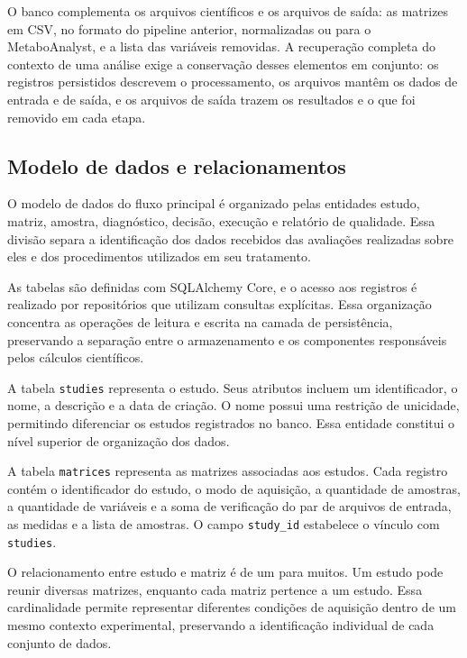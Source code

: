 O banco complementa os arquivos científicos e os arquivos de saída: as matrizes em CSV, no formato do pipeline anterior, normalizadas ou para o MetaboAnalyst, e a lista das variáveis removidas. A recuperação completa do contexto de uma análise exige a conservação desses elementos em conjunto: os registros persistidos descrevem o processamento, os arquivos mantêm os dados de entrada e de saída, e os arquivos de saída trazem os resultados e o que foi removido em cada etapa.

\subsection{Modelo de dados e relacionamentos}
\label{subsec:modelo-dados-relacionamentos}

O modelo de dados do fluxo principal é organizado pelas entidades estudo, matriz, amostra, diagnóstico, decisão, execução e relatório de qualidade. Essa divisão separa a identificação dos dados recebidos das avaliações realizadas sobre eles e dos procedimentos utilizados em seu tratamento.

As tabelas são definidas com SQLAlchemy Core, e o acesso aos registros é realizado por repositórios que utilizam consultas explícitas. Essa organização concentra as operações de leitura e escrita na camada de persistência, preservando a separação entre o armazenamento e os componentes responsáveis pelos cálculos científicos.

A tabela \texttt{studies} representa o estudo. Seus atributos incluem um identificador, o nome, a descrição e a data de criação. O nome possui uma restrição de unicidade, permitindo diferenciar os estudos registrados no banco. Essa entidade constitui o nível superior de organização dos dados.

A tabela \texttt{matrices} representa as matrizes associadas aos estudos. Cada registro contém o identificador do estudo, o modo de aquisição, a quantidade de amostras, a quantidade de variáveis e a soma de verificação do par de arquivos de entrada, as medidas e a lista de amostras. O campo \texttt{study\_\allowbreak{}id} estabelece o vínculo com \texttt{studies}.

O relacionamento entre estudo e matriz é de um para muitos. Um estudo pode reunir diversas matrizes, enquanto cada matriz pertence a um estudo. Essa cardinalidade permite representar diferentes condições de aquisição dentro de um mesmo contexto experimental, preservando a identificação individual de cada conjunto de dados.

